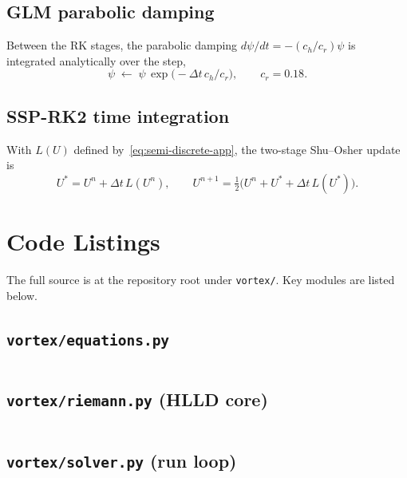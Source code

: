 \documentclass[11pt]{article}
\begin{document}
\subsection{GLM parabolic damping}

Between the RK stages, the parabolic damping $d\psi/dt = -(c_h/c_r)\psi$ is integrated analytically over the step,
\begin{equation}
\psi \;\leftarrow\; \psi\,\exp\!\bigl(-\Delta t\,c_h / c_r\bigr),
\qquad c_r = 0.18.
\label{eq:psi-damp-app}
\end{equation}

\subsection{SSP-RK2 time integration}

With $L(U)$ defined by~\eqref{eq:semi-discrete-app}, the two-stage Shu--Osher update is
\begin{equation}
U^{*} = U^{n} + \Delta t\,L(U^{n}),
\qquad
U^{n+1} = \tfrac{1}{2}\bigl(U^{n} + U^{*} + \Delta t\,L(U^{*})\bigr).
\label{eq:ssp-rk2-app}
\end{equation}

\section{Code Listings}

The full source is at the repository root under \texttt{vortex/}. Key modules are listed below.

\subsection{\texttt{vortex/equations.py}}
\inputminted[firstline=22]{python}{vortex/equations.py}

\subsection{\texttt{vortex/riemann.py} (HLLD core)}
\inputminted[firstline=40, lastline=230]{python}{vortex/riemann.py}

\subsection{\texttt{vortex/solver.py} (run loop)}
\inputminted[firstline=40]{python}{vortex/solver.py}
\end{document}
